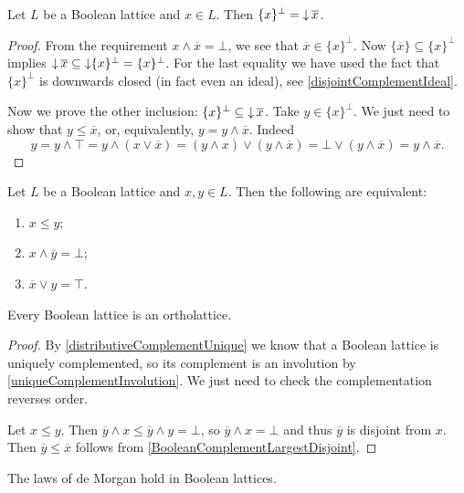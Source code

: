 \begin{lemma} \label{BooleanComplementLargestDisjoint}
Let $L$ be a Boolean lattice and $x\in L$. Then $\{x\}^\perp = \mathop{\downarrow} \overline{x}$.
\end{lemma}
\begin{proof}
From the requirement $x\wedge \overline{x} = \bot$, we see that $\overline{x}\in \{x\}^\perp$. Now $\{\overline{x}\} \subseteq \{x\}^\perp$ implies $\mathop{\downarrow} \overline{x} \subseteq \mathop{\downarrow}\{x\}^\perp = \{x\}^\perp$. For the last equality we have used the fact that $\{x\}^\perp$ is downwards closed (in fact even an ideal), see \ref{disjointComplementIdeal}.

Now we prove the other inclusion: $\{x\}^\perp \subseteq \mathop{\downarrow} \overline{x}$.
Take $y\in \{x\}^\perp$. We just need to show that $y\leq \overline{x}$, or, equivalently, $y = y\wedge \overline{x}$. Indeed
\[ y = y \wedge \top = y\wedge (x\vee \overline{x}) = (y\wedge x)\vee (y\wedge \overline{x}) = \bot \vee (y\wedge \overline{x}) = y\wedge \overline{x}. \]
\end{proof}
\begin{corollary}
Let $L$ be a Boolean lattice and $x,y\in L$. Then the following are equivalent:
\begin{enumerate}
\item $x \leq y$;
\item $x\wedge \overline{y} = \bot$;
\item $\overline{x} \vee y = \top$.
\end{enumerate}
\end{corollary}
\begin{corollary}
Every Boolean lattice is an ortholattice.
\end{corollary}
\begin{proof}
By \ref{distributiveComplementUnique} we know that a Boolean lattice is uniquely complemented, so its complement is an involution by \ref{uniqueComplementInvolution}. We just need to check the complementation reverses order.

Let $x\leq y$. Then $\overline{y} \wedge x \leq \overline{y} \wedge y = \bot$, so $\overline{y} \wedge x = \bot$ and thus $\overline{y}$ is disjoint from $x$. Then $\overline{y} \leq \overline{x}$ follows from \ref{BooleanComplementLargestDisjoint}.
\end{proof}
\begin{corollary}
The laws of de Morgan hold in Boolean lattices.
\end{corollary}

